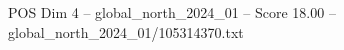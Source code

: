 \begin{textsample}{POS Dim 4 – global\_north\_2024\_01 – Score 18.00 – global\_north\_2024\_01/105314370.txt}
\end{textsample}
